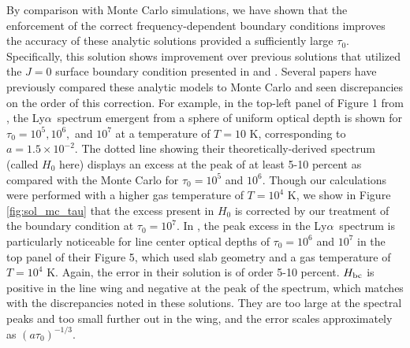 \documentclass{aastex63}
\newcommand\lya{Ly$\alpha$\ }
\begin{document}
By comparison with Monte Carlo simulations, we have shown that the enforcement of the correct frequency-dependent boundary conditions improves the accuracy of these analytic solutions provided a sufficiently large $\tau_0$. Specifically, this solution shows improvement over previous solutions that utilized the $J=0$ surface boundary condition presented in \cite{1973MNRAS.162...43H} and \cite{1990ApJ...350..216N}. Several papers have previously compared these analytic models to Monte Carlo and seen discrepancies on the order of this correction. For example, in the top-left panel of Figure 1 from \cite{2006ApJ...649...14D}, the \lya spectrum emergent from a sphere of uniform optical depth is shown for $\tau_0=10^5, 10^6,$ and $10^7$ at a temperature of $T=10$ K, corresponding to $a=1.5 \times 10^{-2}$. The dotted line showing their theoretically-derived spectrum (called $H_0$ here) displays an excess at the peak of at least 5-10 percent as compared with the Monte Carlo for $\tau_0=10^5$ and $10^6$. Though our calculations were performed with a higher gas temperature of $T=10^4$ K, we show in Figure \ref{fig:sol_mc_tau} that the excess present in $H_0$ is corrected by our treatment of the boundary condition at $\tau_0 = 10^7$. In \citet{2015MNRAS.449.4336S}, the peak excess in the \lya spectrum is particularly noticeable for line center optical depths of $\tau_0=10^6$ and $10^7$ in the top panel of their Figure 5, which used slab geometry and a gas temperature of $T=10^4$ K. Again, the error in their solution is of order 5-10 percent. $H_{\rm bc}$ is positive in the line wing and negative at the peak of the spectrum, which matches with the discrepancies noted in these solutions. They are too large at the spectral peaks and too small further out in the wing, and the error scales approximately as $(a\tau_0)^{-1/3}$.
\end{document}
